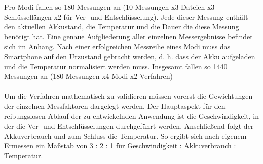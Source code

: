 \documentclass[10pt, a4paper,headsepline]{scrreprt}
\begin{document}
Pro Modi fallen so 180 Messungen an (10 Messungen x3 Dateien x3 Schlüssellängen x2 für Ver- und Entschlüsselung). Jede dieser Messung enthält den aktuellen Akkustand, die Temperatur und die Dauer die diese Messung benötigt hat. Eine genaue Aufgliederung aller einzelnen Messergebnisse befindet sich im Anhang. Nach einer erfolgreichen Messreihe eines Modi muss das Smartphone auf den Urzustand gebracht werden, d. h. dass der Akku aufgeladen und die Temperatur normalisiert werden muss. Insgesamt fallen so 1440 Messungen an (180 Messungen x4 Modi x2 Verfahren)\\ \\
Um die Verfahren mathematisch zu validieren müssen vorerst die Gewichtungen der einzelnen Messfaktoren dargelegt werden. Der Hauptaspekt für den reibungslosen Ablauf der zu entwickelnden Anwendung ist die Geschwindigkeit, in der die Ver- und Entschlüsselungen durchgeführt werden. Anschließend folgt der Akkuverbrauch und zum Schluss die Temperatur. So ergibt sich nach eigenem Ermessen ein Maßstab von 3 : 2 : 1 für Geschwindigkeit : Akkuverbrauch : Temperatur. 
\end{document}

